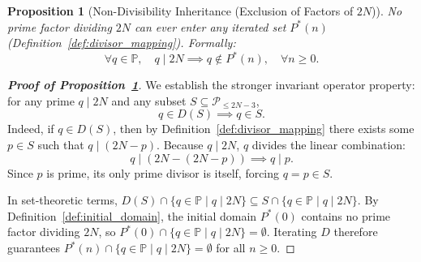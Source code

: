 \documentclass[11pt,a4paper]{article}
\newtheorem{proposition}[theorem]{Proposition}
\theoremstyle{definition}
\begin{document}
\begin{proposition}[Non-Divisibility Inheritance (Exclusion of Factors of $2N$)]
\label{prop:inheritance}
No prime factor dividing $2N$ can ever enter any iterated set $P^*(n)$ (Definition~\ref{def:divisor_mapping}). Formally:
\[
\forall q \in \mathbb{P}, \quad q \mid 2N \implies q \notin P^*(n), \quad \forall n \ge 0.
\]
\end{proposition}
\begin{proof}[\textbf{Proof of Proposition~\ref{prop:inheritance}}]
We establish the stronger invariant operator property: for any prime $q \mid 2N$ and any subset $S \subseteq \mathcal{P}_{\le 2N-3}$,
\[
q \in D(S) \implies q \in S.
\]
Indeed, if $q \in D(S)$, then by Definition~\ref{def:divisor_mapping} there exists some $p \in S$ such that $q \mid (2N - p)$. Because $q \mid 2N$, $q$ divides the linear combination:
\[
q \mid (2N - (2N - p)) \implies q \mid p.
\]
Since $p$ is prime, its only prime divisor is itself, forcing $q = p \in S$. 

In set-theoretic terms, $D(S) \cap \{q \in \mathbb{P} \mid q \mid 2N\} \subseteq S \cap \{q \in \mathbb{P} \mid q \mid 2N\}$. By Definition~\ref{def:initial_domain}, the initial domain $P^*(0)$ contains no prime factor dividing $2N$, so $P^*(0) \cap \{q \in \mathbb{P} \mid q \mid 2N\} = \emptyset$. Iterating $D$ therefore guarantees $P^*(n) \cap \{q \in \mathbb{P} \mid q \mid 2N\} = \emptyset$ for all $n \ge 0$.
\end{proof}
\end{document}
